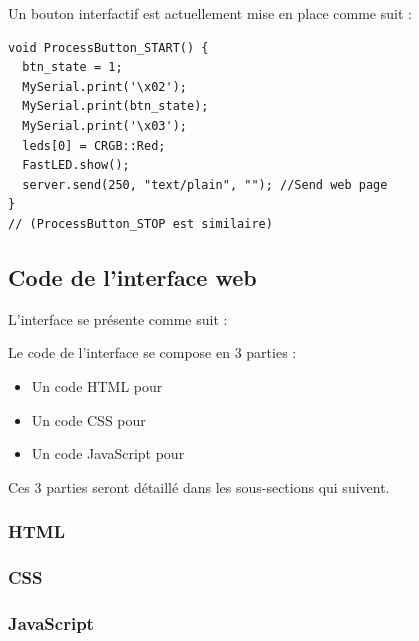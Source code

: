 Un bouton interfactif est actuellement mise en place comme suit :

\begin{verbatim}
void ProcessButton_START() {
  btn_state = 1;
  MySerial.print('\x02');
  MySerial.print(btn_state);
  MySerial.print('\x03');
  leds[0] = CRGB::Red;
  FastLED.show();
  server.send(250, "text/plain", ""); //Send web page
}
// (ProcessButton_STOP est similaire)
\end{verbatim}

\subsection{Code de l'interface web}
L'interface se présente comme suit :



Le code de l'interface se compose en 3 parties :

\begin{itemize}
    \item Un code HTML pour
    \item Un code CSS pour
    \item Un code JavaScript pour
\end{itemize}

Ces 3 parties seront détaillé dans les sous-sections qui suivent.

\subsubsection{HTML}

\subsubsection{CSS}

\subsubsection{JavaScript}